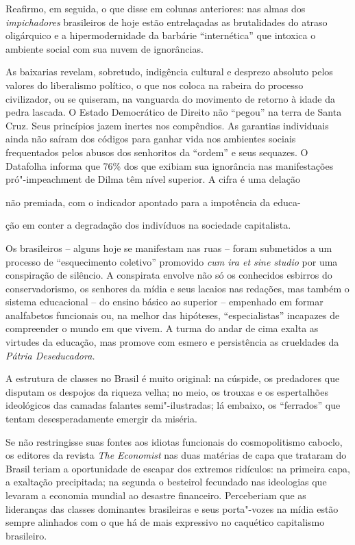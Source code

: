 Reafirmo, em seguida, o que disse em colunas anteriores: nas almas dos
\emph{impichadores} brasileiros de hoje estão entrelaçadas as
brutalidades do atraso oligárquico e a hipermodernidade da barbárie
``internética'' que intoxica o ambiente social com sua nuvem de
ignorâncias.

As baixarias revelam, sobretudo, indigência cultural e desprezo absoluto
pelos valores do liberalismo político, o que nos coloca na rabeira do
processo civilizador, ou se quiseram, na vanguarda do movimento de
retorno à idade da pedra lascada. O Estado Democrático de Direito não
``pegou'' na terra de Santa Cruz. Seus princípios jazem inertes nos
compêndios. As garantias individuais ainda não saíram dos códigos para
ganhar vida nos ambientes sociais frequentados pelos abusos dos
senhoritos da ``ordem'' e seus sequazes. O Datafolha informa que 76\%
dos que exibiam sua ignorância nas manifestações pró"-impeachment de
Dilma têm nível superior. A cifra é uma delação 

\noindent{}não premiada, com o indicador apontado para a impotência da educa-

\noindent{}ção em conter a degradação
dos indivíduos na sociedade capitalista. %

Os brasileiros -- alguns hoje se manifestam nas ruas -- foram submetidos
a um processo de ``esquecimento coletivo'' promovido \emph{cum ira et sine
studio} por uma conspiração de silêncio. A conspirata envolve não só os
conhecidos esbirros do conservadorismo, os senhores da mídia e seus
lacaios nas redações, mas também o sistema educacional -- do ensino
básico ao superior -- empenhado em formar analfabetos funcionais ou, na
melhor das hipóteses, ``especialistas'' incapazes de compreender o mundo
em que vivem. A turma do andar de cima exalta as virtudes da educação,
mas promove com esmero e persistência as crueldades da \emph{Pátria
Deseducadora.}

A estrutura de classes no Brasil é muito original: na cúspide, os
predadores que disputam os despojos da riqueza velha; no meio, os
trouxas e os espertalhões ideológicos das camadas falantes
semi"-ilustradas; lá embaixo, os ``ferrados'' que tentam desesperadamente
emergir da miséria.

Se não restringisse suas fontes aos idiotas funcionais do cosmopolitismo
caboclo, os editores da revista \emph{The Economist} nas duas matérias de
capa que trataram do Brasil teriam a oportunidade de escapar dos
extremos ridículos: na primeira capa, a exaltação precipitada; na
segunda o besteirol fecundado nas ideologias que levaram a economia
mundial ao desastre financeiro. Perceberiam que as lideranças das
classes dominantes brasileiras e seus porta"-vozes na mídia estão sempre
alinhados com o que há de mais expressivo no caquético capitalismo
brasileiro.

